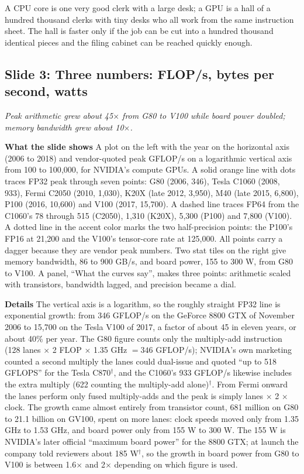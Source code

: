 \documentclass[11pt,letterpaper]{article}
\newcommand{\slide}[3]{%
  \subsection[Slide #1: #2]{Slide #1: #2}%
  {\color{muted}\itshape #3\par}\medskip}
\newcommand{\para}[1]{\medskip\noindent\textbf{#1}\quad}
\newenvironment{intuition}{\begin{tcolorbox}[intuitionbox]}{\end{tcolorbox}}
\begin{document}
\begin{intuition}
A CPU core is one very good clerk with a large desk; a GPU is a hall of a hundred thousand clerks with tiny desks who all work from the same instruction sheet. The hall is faster only if the job can be cut into a hundred thousand identical pieces and the filing cabinet can be reached quickly enough.
\end{intuition}

\slide{3}{Three numbers: FLOP/s, bytes per second, watts}{Peak arithmetic grew about 45$\times$ from G80 to V100 while board power doubled; memory bandwidth grew about 10$\times$.}

\para{What the slide shows} A plot on the left with the year on the horizontal axis (2006 to 2018) and vendor-quoted peak GFLOP/s on a logarithmic vertical axis from 100 to 100{,}000, for NVIDIA's compute GPUs. A solid orange line with dots traces FP32 peak through seven points: G80 (2006, 346), Tesla C1060 (2008, 933), Fermi C2050 (2010, 1{,}030), K20X (late 2012, 3{,}950), M40 (late 2015, 6{,}800), P100 (2016, 10{,}600) and V100 (2017, 15{,}700). A dashed line traces FP64 from the C1060's 78 through 515 (C2050), 1{,}310 (K20X), 5{,}300 (P100) and 7{,}800 (V100). A dotted line in the accent color marks the two half-precision points: the P100's FP16 at 21{,}200 and the V100's tensor-core rate at 125{,}000. All points carry a dagger because they are vendor peak numbers. Two stat tiles on the right give memory bandwidth, 86 to 900 GB/s, and board power, 155 to 300 W, from G80 to V100. A panel, ``What the curves say'', makes three points: arithmetic scaled with transistors, bandwidth lagged, and precision became a dial.

\para{Details} The vertical axis is a logarithm, so the roughly straight FP32 line is exponential growth: from 346 GFLOP/s on the GeForce 8800 GTX of November 2006 to 15{,}700 on the Tesla V100 of 2017, a factor of about 45 in eleven years, or about 40\% per year. The G80 figure counts only the multiply-add instruction (128 lanes $\times$ 2 FLOP $\times$ 1.35 GHz $= 346$ GFLOP/s); NVIDIA's own marketing counted a second multiply the lanes could dual-issue and quoted ``up to 518 GFLOPS'' for the Tesla C870$^\dagger$, and the C1060's 933 GFLOP/s likewise includes the extra multiply (622 counting the multiply-add alone)$^\dagger$. From Fermi onward the lanes perform only fused multiply-adds and the peak is simply lanes $\times$ 2 $\times$ clock. The growth came almost entirely from transistor count, 681 million on G80 to 21.1 billion on GV100, spent on more lanes: clock speeds moved only from 1.35 GHz to 1.53 GHz, and board power only from 155 W to 300 W. The 155 W is NVIDIA's later official ``maximum board power'' for the 8800 GTX; at launch the company told reviewers about 185 W$^\dagger$, so the growth in board power from G80 to V100 is between 1.6$\times$ and 2$\times$ depending on which figure is used.
\end{document}
